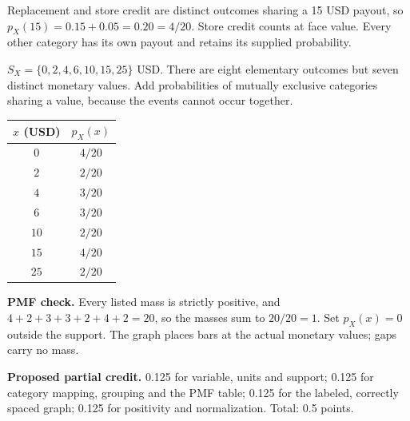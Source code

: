 Replacement and store credit are distinct outcomes sharing a 15 USD payout, so $p_X(15)=0.15+0.05=0.20=4/20$. Store credit counts at face value. Every other category has its own payout and retains its supplied probability.

$S_X=\{0,2,4,6,10,15,25\}$ USD. There are eight elementary outcomes but seven distinct monetary values. Add probabilities of mutually exclusive categories sharing a value, because the events cannot occur together.

\begin{center}
\begin{tabular}{cc}\toprule
$x$ (USD) & $p_X(x)$\\\midrule
$0$ & $4/20$\\
$2$ & $2/20$\\
$4$ & $3/20$\\
$6$ & $3/20$\\
$10$ & $2/20$\\
$15$ & $4/20$\\
$25$ & $2/20$\\
\bottomrule\end{tabular}
\end{center}


\begin{center}\end{center}

\textbf{PMF check.} Every listed mass is strictly positive, and $4+2+3+3+2+4+2=20$, so the masses sum to $20/20=1$. Set $p_X(x)=0$ outside the support. The graph places bars at the actual monetary values; gaps carry no mass.

\textbf{Proposed partial credit.} 0.125 for variable, units and support; 0.125 for category mapping, grouping and the PMF table; 0.125 for the labeled, correctly spaced graph; 0.125 for positivity and normalization. Total: 0.5 points.

